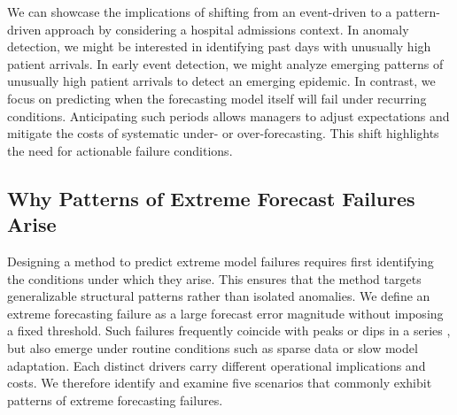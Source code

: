 \documentclass[12pt]{article}
\begin{document}
We can showcase the implications of shifting from an event-driven to a pattern-driven approach by considering a hospital admissions context.  In anomaly detection, we might be
interested in identifying past days with unusually high patient arrivals. %
In early event detection, we might analyze emerging patterns of unusually high patient arrivals to detect an emerging epidemic. In contrast, we focus on predicting when the forecasting model itself will fail under recurring conditions. Anticipating such periods allows managers to adjust expectations and mitigate the costs of systematic under- or over-forecasting. This shift highlights the need for actionable failure conditions.

\subsection{Why Patterns of Extreme Forecast Failures Arise}%

Designing a method to predict extreme model failures requires first identifying the conditions under which they arise. This ensures that the method targets generalizable structural patterns rather than isolated anomalies. We define an extreme forecasting failure as a large forecast error magnitude without imposing a fixed threshold.  Such failures frequently coincide with peaks or dips in a series \citep{marvin2022}, but also emerge under routine conditions such as sparse data or slow model adaptation. Each distinct drivers carry different operational implications and costs. We therefore identify and examine five scenarios that commonly exhibit patterns of extreme forecasting failures.

\end{document}
